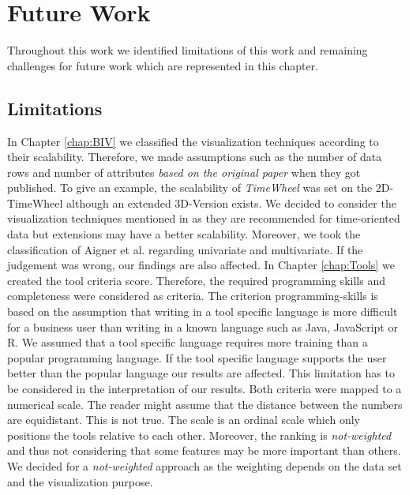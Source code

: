 \chapter{Future Work}
\label{Future Work}
Throughout this work we identified limitations of this work and remaining challenges for future work which are represented in this chapter. 

\section{Limitations} \label{limitations}
In Chapter \ref{chap:BIV} we classified the visualization techniques according to their scalability. Therefore, we made assumptions such as the number of data rows and number of attributes \textit{based on the original paper} when they got published. To give an example, the scalability of \textit{TimeWheel} was set on the 2D-TimeWheel although an extended 3D-Version exists. We decided to consider the visualization techniques mentioned in\cite{Aigner2011} as they are recommended for time-oriented data but extensions may have a better scalability.  
Moreover, we took the classification of Aigner et al.\cite{Aigner2011} regarding univariate and multivariate. If the judgement was wrong, our findings are also affected.
In Chapter \ref{chap:Tools} we created the tool criteria score. Therefore, the required programming skills and completeness were considered as criteria. The criterion programming-skills is based on the assumption that writing in a tool specific language is more difficult for a business user than writing in a known language such as Java, JavaScript or R. We assumed that a tool specific language requires more training than a popular programming language. If the tool specific language supports the user better than the popular language our results are affected. This limitation has to be considered in the interpretation of our results. Both criteria were mapped to a numerical scale. The reader might assume that the distance between the numbers are equidistant. This is not true. The scale is an ordinal scale which only positions the tools relative to each other. Moreover, the ranking is \textit{not-weighted} and thus not considering that some features may be more important than others. We decided for a \textit{not-weighted} approach as the weighting depends on the data set and the visualization purpose. 


